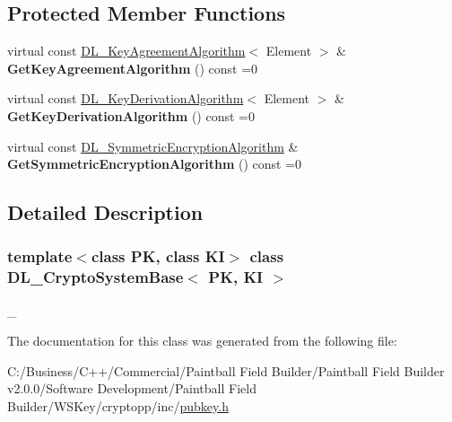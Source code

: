 \subsection*{Protected Member Functions}
\begin{DoxyCompactItemize}
\item 
\hypertarget{class_d_l___crypto_system_base_a4db18d674ab67a96bd2a20dea21fd2b5}{
virtual const \hyperlink{class_d_l___key_agreement_algorithm}{DL\_\-KeyAgreementAlgorithm}$<$ Element $>$ \& {\bfseries GetKeyAgreementAlgorithm} () const =0}
\label{class_d_l___crypto_system_base_a4db18d674ab67a96bd2a20dea21fd2b5}

\item 
\hypertarget{class_d_l___crypto_system_base_a608872d17306b6b27f26fee9e9ee213c}{
virtual const \hyperlink{class_d_l___key_derivation_algorithm}{DL\_\-KeyDerivationAlgorithm}$<$ Element $>$ \& {\bfseries GetKeyDerivationAlgorithm} () const =0}
\label{class_d_l___crypto_system_base_a608872d17306b6b27f26fee9e9ee213c}

\item 
\hypertarget{class_d_l___crypto_system_base_ac7a7898a616c61f475cbec8aaa7ead09}{
virtual const \hyperlink{class_d_l___symmetric_encryption_algorithm}{DL\_\-SymmetricEncryptionAlgorithm} \& {\bfseries GetSymmetricEncryptionAlgorithm} () const =0}
\label{class_d_l___crypto_system_base_ac7a7898a616c61f475cbec8aaa7ead09}

\end{DoxyCompactItemize}


\subsection{Detailed Description}
\subsubsection*{template$<$class PK, class KI$>$ class DL\_\-CryptoSystemBase$<$ PK, KI $>$}

\_\- 

The documentation for this class was generated from the following file:\begin{DoxyCompactItemize}
\item 
C:/Business/C++/Commercial/Paintball Field Builder/Paintball Field Builder v2.0.0/Software Development/Paintball Field Builder/WSKey/cryptopp/inc/\hyperlink{pubkey_8h}{pubkey.h}\end{DoxyCompactItemize}
